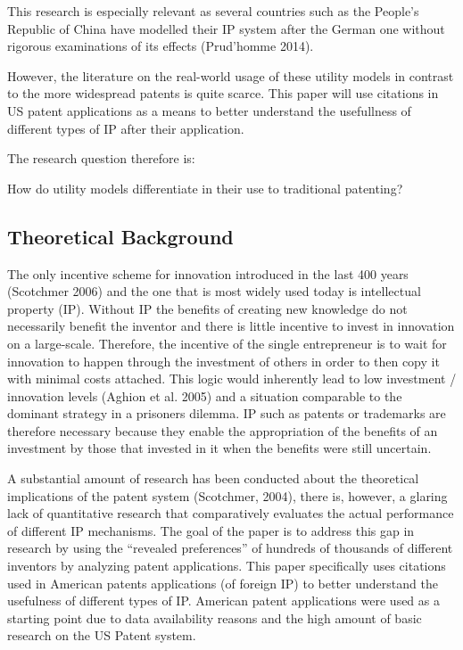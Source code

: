 \documentclass[
  12pt,
]{article}
\begin{document}
This research is especially relevant as several countries such as the
People's Republic of China have modelled their IP system after the
German one without rigorous examinations of its effects (Prud'homme
2014).

However, the literature on the real-world usage of these utility models
in contrast to the more widespread patents is quite scarce. This paper
will use citations in US patent applications as a means to better
understand the usefullness of different types of IP after their
application.

The research question therefore is:

How do utility models differentiate in their use to traditional
patenting?

\hypertarget{theoretical-background}{%
\subsection{Theoretical Background}\label{theoretical-background}}

The only incentive scheme for innovation introduced in the last 400
years (Scotchmer 2006) and the one that is most widely used today is
intellectual property (IP). Without IP the benefits of creating new
knowledge do not necessarily benefit the inventor and there is little
incentive to invest in innovation on a large-scale. Therefore, the
incentive of the single entrepreneur is to wait for innovation to happen
through the investment of others in order to then copy it with minimal
costs attached. This logic would inherently lead to low investment /
innovation levels (Aghion et al. 2005) and a situation comparable to the
dominant strategy in a prisoners dilemma. IP such as patents or
trademarks are therefore necessary because they enable the appropriation
of the benefits of an investment by those that invested in it when the
benefits were still uncertain.

A substantial amount of research has been conducted about the
theoretical implications of the patent system (Scotchmer, 2004), there
is, however, a glaring lack of quantitative research that comparatively
evaluates the actual performance of different IP mechanisms. The goal of
the paper is to address this gap in research by using the ``revealed
preferences'' of hundreds of thousands of different inventors by
analyzing patent applications. This paper specifically uses citations
used in American patents applications (of foreign IP) to better
understand the usefulness of different types of IP. American patent
applications were used as a starting point due to data availability
reasons and the high amount of basic research on the US Patent system.
\end{document}
